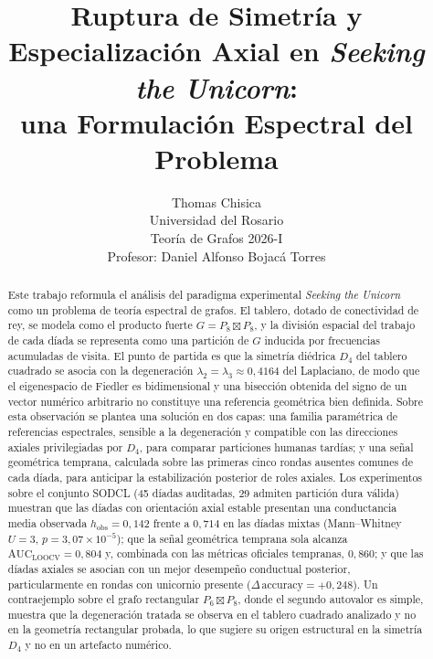 \documentclass[journal]{IEEEtran}
\begin{document}
\title{Ruptura de Simetría y Especialización Axial en \emph{Seeking the Unicorn}:\\ una Formulación Espectral del Problema}

\author{Thomas Chisica\\
Universidad del Rosario\\
Teoría de Grafos 2026-I\\
Profesor: Daniel Alfonso Bojacá Torres}

\maketitle

\begin{abstract}
Este trabajo reformula el análisis del paradigma experimental \emph{Seeking the Unicorn} como un problema de teoría espectral de grafos. El tablero, dotado de conectividad de rey, se modela como el producto fuerte $G = P_8 \boxtimes P_8$, y la división espacial del trabajo de cada díada se representa como una partición de $G$ inducida por frecuencias acumuladas de visita. El punto de partida es que la simetría diédrica $D_4$ del tablero cuadrado se asocia con la degeneración $\lambda_2 = \lambda_3 \approx 0{,}4164$ del Laplaciano, de modo que el eigenespacio de Fiedler es bidimensional y una bisección obtenida del signo de un vector numérico arbitrario no constituye una referencia geométrica bien definida. Sobre esta observación se plantea una solución en dos capas: una familia paramétrica de referencias espectrales, sensible a la degeneración y compatible con las direcciones axiales privilegiadas por $D_4$, para comparar particiones humanas tardías; y una señal geométrica temprana, calculada sobre las primeras cinco rondas ausentes comunes de cada díada, para anticipar la estabilización posterior de roles axiales. Los experimentos sobre el conjunto SODCL (45 díadas auditadas, 29 admiten partición dura válida) muestran que las díadas con orientación axial estable presentan una conductancia media observada $h_{\mathrm{obs}} = 0{,}142$ frente a $0{,}714$ en las díadas mixtas (Mann--Whitney $U=3$, $p = 3{,}07 \times 10^{-5}$); que la señal geométrica temprana sola alcanza $\mathrm{AUC}_{\mathrm{LOOCV}} = 0{,}804$ y, combinada con las métricas oficiales tempranas, $0{,}860$; y que las díadas axiales se asocian con un mejor desempeño conductual posterior, particularmente en rondas con unicornio presente ($\Delta\,\mathrm{accuracy} = +0{,}248$). Un contraejemplo sobre el grafo rectangular $P_6 \boxtimes P_8$, donde el segundo autovalor es simple, muestra que la degeneración tratada se observa en el tablero cuadrado analizado y no en la geometría rectangular probada, lo que sugiere su origen estructural en la simetría $D_4$ y no en un artefacto numérico.
\end{abstract}
\end{document}
